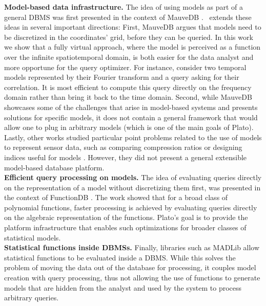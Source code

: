 \textbf{Model-based data infrastructure.}
The idea of using models as part of a general DBMS was first presented in the context of MauveDB \cite{mauvedb-grid, mauvedb-cidr, mauvedb-vldb}. \projName\ extends these ideas in several important directions: First, MauveDB argues that models need to be discretized in the coordinates' grid, before they can be queried. In this work we show that a fully virtual approach, where the model is perceived as a function over the infinite spatiotemporal domain, is both easier for the data analyst and more opportune for the query optimizer. For instance, consider two temporal models represented by their Fourier transform and a query asking for their correlation. It is most efficient to compute this query directly on the frequency domain rather than bring it back to the time domain. Second, while MauveDB showcases some of the challenges that arise in model-based systems and presents solutions for specific models, it does not contain a general framework that would allow one to plug in arbitrary models (which is one of the main goals of Plato). 
Lastly, other works studied particular point problems related to the use of models to represent sensor data, such as comparing compression ratios or designing indices useful for models \cite{aberer-cloud, aberer-compression}. However, they did not present a general extensible model-based database platform.\\


\textbf{Efficient query processing on models.} The idea of evaluating queries directly on the representation of a model without discretizing them first, was presented in the context of FunctionDB \cite{functiondb}. The work showed that for a broad class of polynomial functions, faster processing is achieved by evaluating queries directly on the algebraic representation of the functions. Plato's goal is to provide the platform infrastructure that enables such optimizations for broader classes of statistical models.\\

\textbf{Statistical functions inside DBMSs.} Finally, libraries such as MADLib \cite{madlib} allow statistical functions to be evaluated inside a DBMS. While this solves the problem of moving the data out of the database for processing, it couples model creation with query processing, thus not allowing the use of functions to generate models that are hidden from the analyst and used by the system to process arbitrary queries.


